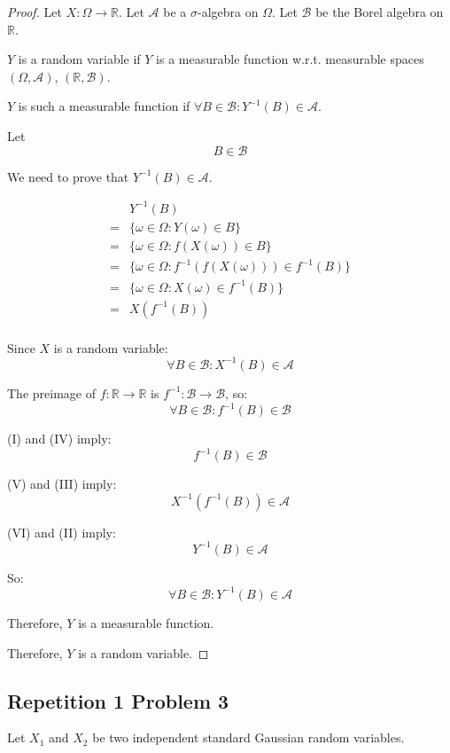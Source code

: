 \documentclass{article}
\begin{document}
\begin{proof}
Let \(X:\Omega\to \mathbb{R}\).
Let \(\mathcal{A}\) be a \(\sigma\)-algebra on \(\Omega\).
Let \(\mathcal{B}\) be the Borel algebra on \(\mathbb{R}\).

\(Y\) is a random variable if \(Y\) is a measurable function w.r.t. measurable
spaces \((\Omega, \mathcal{A})\), \((\mathbb{R}, \mathcal{B})\).

\(Y\) is such a measurable function if \(\forall B\in \mathcal{B}: Y^{-1}(B)\in \mathcal{A}\).

Let
\[B\in \mathcal{B}\tag{I}\]

We need to prove that \(Y^{-1}(B)\in \mathcal{A}\).

\begin{align*}
	 & Y^{-1}(B) \\
	=& \{\omega\in \Omega: Y(\omega)\in B\} \\
	=& \{\omega\in \Omega: f(X(\omega))\in B\} \\
	=& \{\omega\in \Omega: f^{-1}(f(X(\omega)))\in f^{-1}(B)\} \\
	=& \{\omega\in \Omega: X(\omega)\in f^{-1}(B)\} \\
	=& X(f^{-1}(B)) \tag{II} \\
\end{align*}

Since \(X\) is a random variable:
\[\forall B\in \mathcal{B}: X^{-1}(B)\in \mathcal{A} \tag{III}\]

The preimage of \(f:\mathbb{R}\to\mathbb{R}\) is \(f^{-1}: \mathcal{B} \to\mathcal{B}\), so:
\[\forall B \in \mathcal{B}: f^{-1}(B)\in \mathcal{B} \tag{IV}\]

(I) and (IV) imply:
\[f^{-1}(B) \in \mathcal{B} \tag{V}\]

(V) and (III) imply:
\[X^{-1}(f^{-1}(B))\in \mathcal{A}\tag{VI}\]

(VI) and (II) imply:
\[Y^{-1}(B) \in \mathcal{A}\]

So:
\[\forall B\in \mathcal{B}:Y^{-1}(B) \in \mathcal{A}\]

Therefore, \(Y\) is a measurable function.

Therefore, \(Y\) is a random variable.
\end{proof}

\subsection{Repetition 1 Problem 3}

\begin{sproblem}
Let \(X_1\) and \(X_2\) be two independent standard Gaussian random variables.
\end{sproblem}
\end{document}

